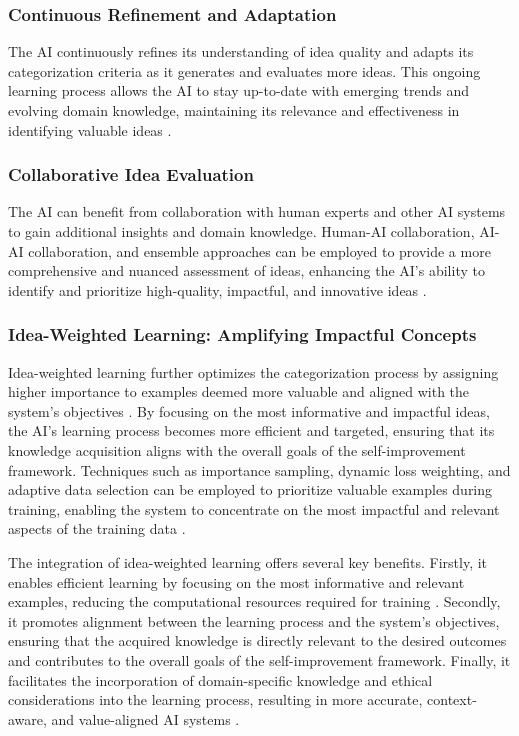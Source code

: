 \documentclass[conference]{article}
\begin{document}
	\subsubsection{Continuous Refinement and Adaptation}
	
	The AI continuously refines its understanding of idea quality and adapts its categorization criteria as it generates and evaluates more ideas. This ongoing learning process allows the AI to stay up-to-date with emerging trends and evolving domain knowledge, maintaining its relevance and effectiveness in identifying valuable ideas \cite{silver2017mastering, thrun2005probabilistic}.
	
	\subsubsection{Collaborative Idea Evaluation}
	
	The AI can benefit from collaboration with human experts and other AI systems to gain additional insights and domain knowledge. Human-AI collaboration, AI-AI collaboration, and ensemble approaches can be employed to provide a more comprehensive and nuanced assessment of ideas, enhancing the AI's ability to identify and prioritize high-quality, impactful, and innovative ideas \cite{kamar2012combining, wang2016deep}.
	
	\subsubsection{Idea-Weighted Learning: Amplifying Impactful Concepts}
	
	Idea-weighted learning further optimizes the categorization process by assigning higher importance to examples deemed more valuable and aligned with the system's objectives \cite{boden2004creative, benedek2012creativity}. By focusing on the most informative and impactful ideas, the AI's learning process becomes more efficient and targeted, ensuring that its knowledge acquisition aligns with the overall goals of the self-improvement framework. Techniques such as importance sampling, dynamic loss weighting, and adaptive data selection \cite{katharopoulos2018not, lin2017focal, fan2017learning} can be employed to prioritize valuable examples during training, enabling the system to concentrate on the most impactful and relevant aspects of the training data \cite{bengio2009curriculum, kumar2010self}.
	
	The integration of idea-weighted learning offers several key benefits. Firstly, it enables efficient learning by focusing on the most informative and relevant examples, reducing the computational resources required for training \cite{katharopoulos2018not, lin2017focal, fan2017learning}. Secondly, it promotes alignment between the learning process and the system's objectives, ensuring that the acquired knowledge is directly relevant to the desired outcomes and contributes to the overall goals of the self-improvement framework. Finally, it facilitates the incorporation of domain-specific knowledge and ethical considerations into the learning process, resulting in more accurate, context-aware, and value-aligned AI systems \cite{bostrom2017superintelligence, russell2019human}.
	
\end{document}

